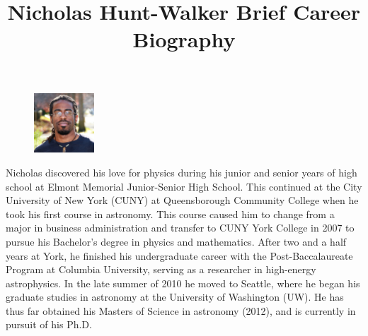 \title{Nicholas Hunt-Walker Brief Career Biography}
\maketitle

\begin{figure}
\vspace{-15pt}
\includegraphics[width=0.2\textwidth]{profile.jpg}
\vspace{-10pt}
\end{figure}
\noindent Nicholas discovered his love for physics during his junior and senior years of high school at Elmont Memorial Junior-Senior High School. This continued at the City University of New York (CUNY) at Queensborough Community College when he took his first course in astronomy. This course caused him to change from a major in business administration and transfer to CUNY York College in 2007 to pursue his Bachelor's degree in physics and mathematics. After two and a half years at York, he finished his undergraduate career with the Post-Baccalaureate Program at Columbia University, serving as a researcher in high-energy astrophysics.  In the late summer of 2010 he moved to Seattle, where he began his graduate studies in astronomy at the University of Washington (UW). He has thus far obtained his Masters of Science in astronomy (2012), and is currently in pursuit of his Ph.D.\\

